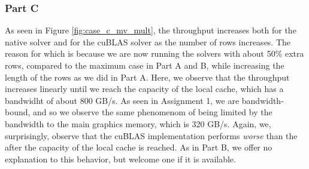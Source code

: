 \documentclass[9pt]{article}
\begin{document}
\subsubsection{Part C}
As seen in Figure \ref{fig:case_c_mv_mult}, the throughput increases both for the native solver and for the cuBLAS solver as the number of rows increases. The reason for which is because we are now running the solvers with about 50\% extra rows, compared to the maximum case in Part A and B, while increasing the length of the rows as we did in Part A. Here, we observe that the throughput increases linearly until we reach the capacity of the local cache, which has a bandwidht of about 800 GB/s. As seen in Assignment 1, we are bandwidth-bound, and so we observe the same phenomenom of being limited by the bandwidth to the main graphics memory, which is 320 GB/s. Again, we, surprisingly, observe that the cuBLAS implementation performs \textit{worse} than the after the capacity of the local cache is reached. As in Part B, we offer no explanation to this behavior, but welcome one if it is available. 
\end{document}

